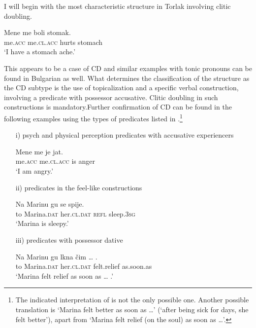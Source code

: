 \documentclass[output=paper,
colorlinks,
citecolor=brown,
newtxmath
]{langscibook}
\begin{document}
I will begin with the most characteristic structure in Torlak involving clitic doubling.


\ea\label{ex:10}
\gll Mene   me        boli  stomak.\\
     me.\textsc{acc} me.\textsc{cl.acc} hurts stomach \\
\glt `I have a stomach ache.'
\z

\largerpage[-2] %
\noindent This appears to be a case of CD and similar examples with tonic pronouns can be found in Bulgarian as well. What determines the classification of the structure as the CD subtype is the use of topicalization and a specific verbal construction, involving a predicate with possessor accusative. Clitic doubling in such constructions is mandatory.\largerpage[-1] %
Further confirmation of CD can be found in the following examples using the types of predicates listed in \citet{Cinque.Krapova2008}.\footnote{The indicated interpretation of  is not the only possible one. Another possible translation is `Marina felt better as soon as {\dots}' (`after being sick for days, she felt better'), apart from `Marina felt relief (on the soul) as soon as {\dots}'.}

\begin{itemize}
\item[i)] psych and physical perception predicates with accusative experiencers


\ea\label{ex:11}
\gll Mene   me        je  jat.\\
     me.\textsc{acc} me.\textsc{cl.acc} is  anger \\
\glt `I am angry.'
\z
\item[ii)] predicates in the feel-like constructions


\ea\label{ex:12}
\gll Na Marinu     gu         se spije.\\
     to Marina.\textsc{dat} her.\textsc{cl.dat} \textsc{refl} sleep.\textsc{3sg}\\
\glt `Marina is sleepy.'
\z

    \largerpage[2]

\item[iii)] predicates with possessor dative


\ea\label{ex:13}
\gll Na Marinu     gu         lkna      čim {\dots} .\\
     to Marina.\textsc{dat} her.\textsc{cl.dat} {felt.relief} {as.soon.as}\\
\glt `Marina felt relief as soon as {\dots} .'
\z

\end{itemize}
\end{document}
